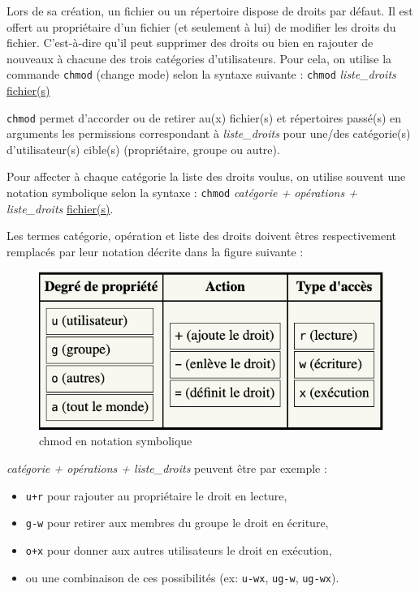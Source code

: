 \documentclass{article}
\begin{document}
Lors de sa création, un fichier ou un répertoire dispose de droits par défaut. Il est offert au propriétaire d'un fichier (et seulement à lui) de modifier les droits du fichier. C'est-à-dire qu'il peut supprimer des droits ou bien en rajouter de nouveaux à chacune des trois catégories d'utilisateurs. 
Pour cela, on utilise la commande \texttt{chmod} (change mode) selon la syntaxe suivante :  \texttt{chmod} \emph{liste\_droits} \underline{fichier(s)} 

\texttt{chmod} permet d'accorder ou de retirer au(x) fichier(s) et répertoires passé(s) en arguments les permissions
correspondant à \emph{liste\_droits} pour une/des catégorie(s) d'utilisateur(s) cible(s) (propriétaire, groupe ou autre). 

Pour affecter à chaque catégorie la liste des droits voulus, on utilise souvent une notation symbolique selon la syntaxe : \texttt{chmod} \emph{catégorie + opérations + liste\_droits} \underline{fichier(s)}.

Les termes catégorie, opération et liste des droits doivent êtres respectivement remplacés par leur notation décrite dans la figure suivante : 

\begin{figure}[h!]
    \begin{center}
    \includegraphics[scale=0.4]{chmod.png}
    \caption{chmod en notation symbolique}
     \end{center}
\end{figure}    

\emph{catégorie + opérations + liste\_droits} peuvent être par exemple :

\begin{itemize}
\tightlist
\item
  \texttt{u+r} pour rajouter au propriétaire le droit en lecture,
\item
  \texttt{g-w} pour retirer aux membres du groupe le droit en écriture,
\item
  \texttt{o+x} pour donner aux autres utilisateurs le droit en
  exécution,
\item
  ou une combinaison de ces possibilités (ex: \texttt{u-wx},
  \texttt{ug-w}, \texttt{ug-wx}).
\end{itemize}
\end{document}

